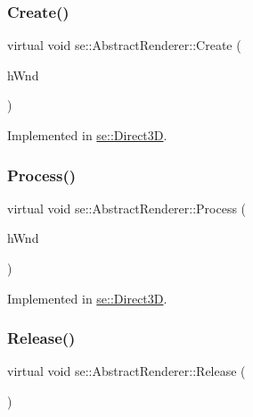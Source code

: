 \subsubsection{\texorpdfstring{Create()}{Create()}}
{\footnotesize\ttfamily virtual void se\+::\+Abstract\+Renderer\+::\+Create (\begin{DoxyParamCaption}\item[{H\+W\+ND}]{h\+Wnd }\end{DoxyParamCaption})\hspace{0.3cm}{\ttfamily [pure virtual]}}



Implemented in \mbox{\hyperlink{classse_1_1_direct3_d_a316456762829db0614077cccd655e654}{se\+::\+Direct3D}}.

\mbox{\label{classse_1_1_abstract_renderer_a302d3f6e465ad7df40c317068a5420fc}} 
\subsubsection{\texorpdfstring{Process()}{Process()}}
{\footnotesize\ttfamily virtual void se\+::\+Abstract\+Renderer\+::\+Process (\begin{DoxyParamCaption}\item[{H\+W\+ND}]{h\+Wnd }\end{DoxyParamCaption})\hspace{0.3cm}{\ttfamily [pure virtual]}}



Implemented in \mbox{\hyperlink{classse_1_1_direct3_d_a64e4eb2d2516261468e2e23c92dec1b4}{se\+::\+Direct3D}}.

\mbox{\label{classse_1_1_abstract_renderer_a98e35b7db62827580573185ed91b25bb}} 
\subsubsection{\texorpdfstring{Release()}{Release()}}
{\footnotesize\ttfamily virtual void se\+::\+Abstract\+Renderer\+::\+Release (\begin{DoxyParamCaption}{ }\end{DoxyParamCaption})\hspace{0.3cm}{\ttfamily [pure virtual]}}



